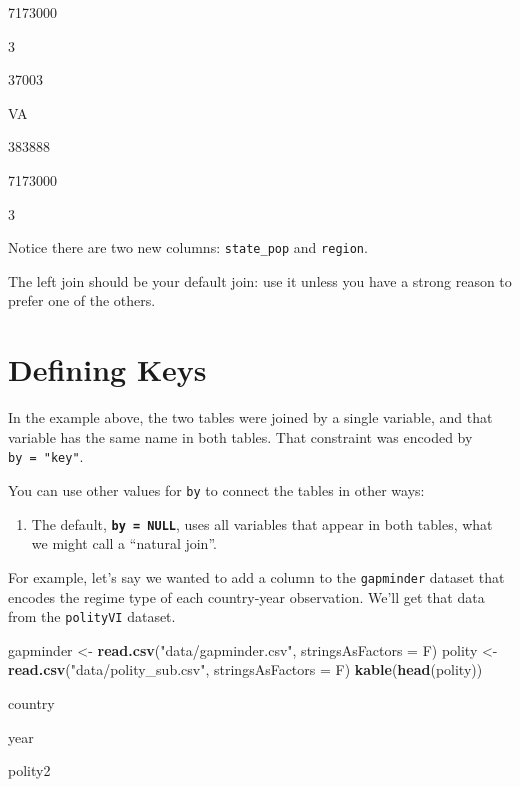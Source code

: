 \documentclass[]{book}
\newenvironment{Shaded}{\begin{snugshade}}{\end{snugshade}}
\newcommand{\KeywordTok}[1]{\textcolor[rgb]{0.13,0.29,0.53}{\textbf{#1}}}
\newcommand{\DataTypeTok}[1]{\textcolor[rgb]{0.13,0.29,0.53}{#1}}
\newcommand{\StringTok}[1]{\textcolor[rgb]{0.31,0.60,0.02}{#1}}
\newcommand{\NormalTok}[1]{#1}
\providecommand{\tightlist}{%
  \setlength{\itemsep}{0pt}\setlength{\parskip}{0pt}}
\begin{document}
7173000

3

37003

VA

383888

7173000

3

Notice there are two new columns: \texttt{state\_pop} and
\texttt{region}.

The left join should be your default join: use it unless you have a
strong reason to prefer one of the others.

\section{Defining Keys}\label{defining-keys}

In the example above, the two tables were joined by a single variable,
and that variable has the same name in both tables. That constraint was
encoded by \texttt{by\ =\ "key"}.

You can use other values for \texttt{by} to connect the tables in other
ways:

\begin{enumerate}
\def\labelenumi{\arabic{enumi}.}
\tightlist
\item
  The default, \textbf{\texttt{by\ =\ NULL}}, uses all variables that
  appear in both tables, what we might call a ``natural join''.
\end{enumerate}

For example, let's say we wanted to add a column to the
\texttt{gapminder} dataset that encodes the regime type of each
country-year observation. We'll get that data from the \texttt{polityVI}
dataset.

\begin{Shaded}
\begin{Highlighting}[]
\NormalTok{gapminder <-}\StringTok{ }\KeywordTok{read.csv}\NormalTok{(}\StringTok{"data/gapminder.csv"}\NormalTok{, }\DataTypeTok{stringsAsFactors =}\NormalTok{ F)}
\NormalTok{polity <-}\StringTok{ }\KeywordTok{read.csv}\NormalTok{(}\StringTok{"data/polity_sub.csv"}\NormalTok{, }\DataTypeTok{stringsAsFactors =}\NormalTok{ F)}
\KeywordTok{kable}\NormalTok{(}\KeywordTok{head}\NormalTok{(polity))}
\end{Highlighting}
\end{Shaded}

country

year

polity2
\end{document}
